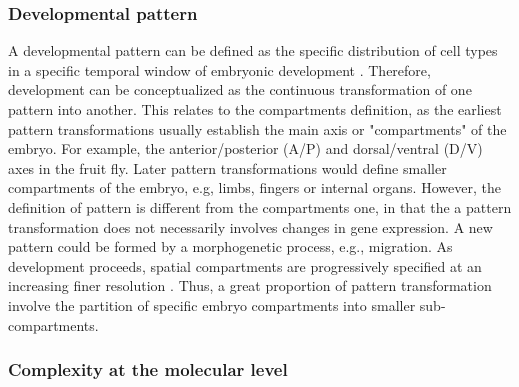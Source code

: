 \subsubsection{Developmental pattern}
A developmental pattern can be defined as the specific distribution of cell types in a specific temporal window of embryonic development \citep{Salazar-Ciudad2004}. 
Therefore, development can be conceptualized as the continuous transformation of one pattern into another.
This relates to the compartments definition, as the earliest pattern transformations usually establish the main axis or "compartments" of the embryo. For example, the anterior/posterior (A/P) and dorsal/ventral (D/V) axes in the fruit fly.
Later pattern transformations would define smaller compartments of the embryo, e.g, limbs, fingers  or internal organs.
However, the definition of pattern is different from the compartments one, in that the a pattern transformation does not necessarily involves changes in gene expression. A new pattern could be formed by a morphogenetic process, e.g., migration.
\hfill \break
As development proceeds, spatial compartments are progressively specified at an increasing finer resolution \citep{Davidson2001}.
Thus, a great proportion of pattern transformation involve the partition of specific embryo compartments into smaller sub-compartments.
%


%
%
\subsubsection{Complexity at the molecular level}

